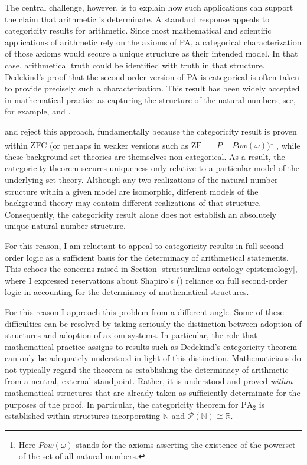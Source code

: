 \documentclass[11pt,a4paper]{article}
\begin{document}
The central challenge, however, is to explain how such applications can support the claim that arithmetic is determinate. A standard response appeals to categoricity results for arithmetic. Since most mathematical and scientific applications of arithmetic rely on the axioms of PA, a categorical characterization of those axioms would secure a unique structure as their intended model. In that case, arithmetical truth could be identified with truth in that structure. Dedekind's proof that the second-order version of PA is categorical \parencite{Dedekind1888} is often taken to provide precisely such a characterization. This result has been widely accepted in mathematical practice as capturing the structure of the natural numbers; see, for example, \textcite[47]{maclane1986mathematics} and \textcite[141]{Ferreiros2023ConStructuralism}.

\textcite[19]{Feferman2011a} and \textcite[511]{Koellner2016} reject this approach, fundamentally because the categoricity result is proven within $\mathrm{ZFC}$ (or perhaps in weaker versions such as $\mathrm{ZF}^- -P + Pow(\omega)$)\footnote{Here $Pow(\omega)$ stands for the axioms asserting the existence of the powerset of the set of all natural numbers.} , while these background set theories are themselves non-categorical. As a result, the categoricity theorem secures uniqueness only relative to a particular model of the underlying set theory. Although any two realizations of the natural-number structure within a given model are isomorphic, different models of the background theory may contain different realizations of that structure. Consequently, the categoricity result alone does not establish an absolutely unique natural-number structure. 

For this reason, I am reluctant to appeal to categoricity results in full second-order logic as a sufficient basis for the determinacy of arithmetical statements. This echoes the concerns raised in Section \ref{structuralims-ontology-epistemology}, where I expressed reservations about Shapiro's (\citeyear{shapiro1991foundations}) reliance on full second-order logic in accounting for the determinacy of mathematical structures.

For this reason I approach this problem from a different angle. Some of these difficulties can be resolved by taking seriously the distinction between adoption of structures and adoption of axiom systems. In particular, the role that mathematical practice assigns to results such as Dedekind's categoricity theorem can only be adequately understood in light of this distinction. Mathematicians do not typically regard the theorem as establishing the determinacy of arithmetic from a neutral, external standpoint. Rather, it is understood and proved \textit{within} mathematical structures that are already taken as sufficiently determinate for the purposes of the proof. In particular, the categoricity theorem for $\mathrm{PA}_2$ is established within structures incorporating $\mathbb{N}$ and $\mathcal{P}(\mathbb{N}) \cong \mathbb{R}$.
\end{document}
